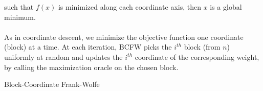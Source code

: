 \documentclass{article}
\begin{document}
such that $f(x)$ is minimized along each coordinate axis, then $x$ is a global minimum.
\\
\\
As in coordinate descent, we minimize the objective function one coordinate (block) at a time. At each iteration, BCFW picks the $i^{th}$ block (from $n$) uniformly at random and updates the $i^{th}$ coordinate of the corresponding weight, by calling the maximization oracle on the chosen block.
\begin{algorithm}[tb]
   \caption{Block-Coordinate Frank-Wolfe}
   \label{alg:example}
\begin{algorithmic}
    \\
    \ENDFOR
\end{algorithmic}
\end{algorithm}
\end{document}
